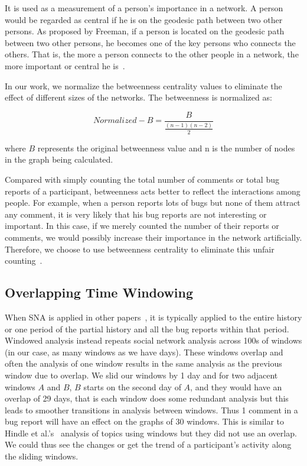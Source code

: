 \documentclass[conference]{IEEEtran}
\begin{document}
It is used as a measurement of a person's importance in a network. 
A person would be regarded as central if he is on the geodesic path
between two other persons. 
As proposed by Freeman, if a person is located
on the geodesic path between two other persons, he becomes one of the key
persons who connects the others. 
That is, the more a person connects to
the other people in a network, the more important or central he is~\cite{BOOK:han}.


In our work, we normalize the betweenness centrality values to eliminate the effect of different sizes of the
networks. The betweenness is normalized as:

\begin{equation}
\label{normalizedb}
Normalized-B = \frac{B}{\frac{(n-1)(n-2)}{2}}
\end{equation} 

where $B$ represents the original betweenness value and n is the number of nodes in the graph being calculated.

Compared with simply counting the total number of comments or total
bug reports of a participant, betweenness acts better to reflect the
interactions among people. For example, when a person reports lots of
bugs but none of them attract any comment, it is very likely that
his bug reports are not interesting or important. In this case, if
we merely counted the number of their reports or comments, we would
possibly increase their importance in the network
artificially. Therefore, we choose to use betweenness centrality to
eliminate this unfair counting~\cite{ICSEsocio:la}.

\subsection{Overlapping Time Windowing}
\label{overlappingtimewindowing}
When SNA is applied in other
papers~\cite{MSR:christ,ICSEsocio:meneely}, it is typically applied to
the entire history or one period of the partial history and all the
bug reports within that period.
Windowed analysis instead repeats social network analysis across 100s
of windows (in our case, as many windows as we have days). These
windows overlap and often the analysis of one window results in the
same analysis as the previous window due to overlap. We slid our
windows by 1 day and for two adjacent windows
$A$ and $B$, $B$ starts on the second day of $A$, and they would have
an overlap of 29 days, that is each window does
some redundant analysis but this leads to smoother transitions in
analysis between windows. Thus 1 comment in a bug report will have an
effect on the graphs of 30 windows. This is similar to Hindle et
al.'s~\cite{ICSMwindowed:hindle} analysis of topics using windows but
they did not use an overlap. We could thus see the changes or get the trend of a participant's activity along the sliding windows.
\end{document}
